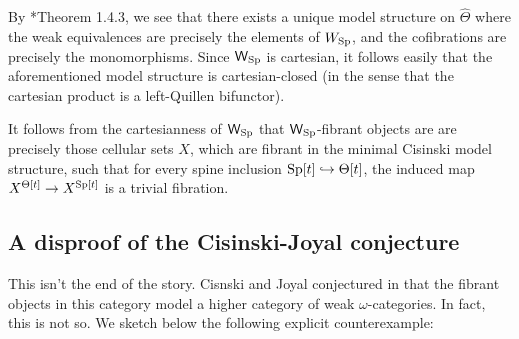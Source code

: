 By \cite{cisinski-book}*{Theorem 1.4.3}, we see that there exists a unique model structure on \(\widehat{\Theta}\) where the weak equivalences are precisely the elements of \(W_{{\operatorname{Sp}}}\), and the cofibrations are precisely the monomorphisms.  Since \(\mathsf{W}_{{\operatorname{Sp}}}\) is cartesian, it follows easily that the aforementioned model structure is cartesian-closed (in the sense that the cartesian product is a left-Quillen bifunctor).  

It follows from the cartesianness of \(\mathsf{W}_{{\operatorname{Sp}}}\) that \(\mathsf{W}_{{\operatorname{Sp}}}\)-fibrant objects are are precisely those cellular sets \(X\), which are fibrant in the minimal Cisinski model structure, such that for every spine inclusion \({\operatorname{Sp}}[t]\hookrightarrow \Theta[t]\), the induced map \(X^{\Theta[t]}\to X^{{\operatorname{Sp}}[t]}\) is a trivial fibration.

\subsection{A disproof of the Cisinski-Joyal conjecture}
This isn't the end of the story.  Cisnski and Joyal conjectured in \cite{joyal-quategory} that the fibrant objects in this category model a higher category of weak \(\omega\)-categories.  In fact, this is not so. We sketch below the following explicit counterexample:

